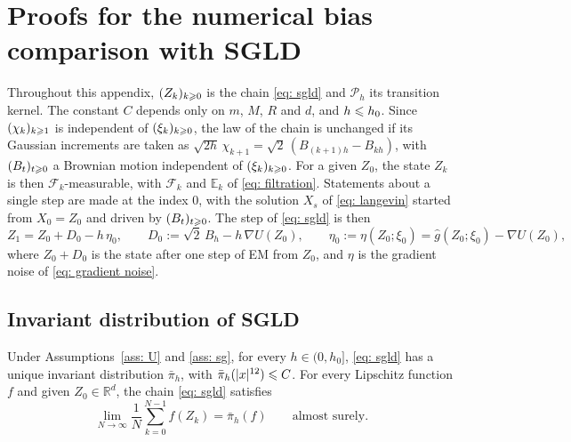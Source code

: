 \section{Proofs for the numerical bias comparison with SGLD}
\label{app: sgld}

Throughout this appendix, $(Z_k)_{k \geqslant 0}$ is the chain \eqref{eq: sgld} and $\mathcal P_h$ its transition kernel. The constant $C$ depends only on $m$, $M$, $R$ and $d$, and $h \leqslant h_0$. Since $(\chi_k)_{k \geqslant 1}$ is independent of $(\xi_k)_{k \geqslant 0}$, the law of the chain is unchanged if its Gaussian increments are taken as $\sqrt{2h}\, \chi_{k+1} = \sqrt2\, (B_{(k+1)h} - B_{kh})$, with $(B_t)_{t \geqslant 0}$ a Brownian motion independent of $(\xi_k)_{k \geqslant 0}$. For a given $Z_0$, the state $Z_k$ is then $\mathcal F_k$-measurable, with $\mathcal F_k$ and $\mathbb E_k$ of \eqref{eq: filtration}. Statements about a single step are made at the index $0$, with the solution $X_s$ of \eqref{eq: langevin} started from $X_0 = Z_0$ and driven by $(B_t)_{t \geqslant 0}$. The step of \eqref{eq: sgld} is then
\begin{equation}
    Z_1 = Z_0 + D_0 - h\, \eta_0 , \qquad D_0 := \sqrt2\, B_h - h\, \nabla U(Z_0) , \qquad \eta_0 := \eta(Z_0;\xi_0) = \hat g(Z_0;\xi_0) - \nabla U(Z_0) ,
    \label{eq: sgld step}
\end{equation}
where $Z_0 + D_0$ is the state after one step of EM from $Z_0$, and $\eta$ is the gradient noise of \eqref{eq: gradient noise}.

\subsection{Invariant distribution of SGLD}
\label{sec: sgld invariant proof}

\begin{lemma}
\label{lem: sgld invariant}
    Under Assumptions~\ref{ass: U} and \ref{ass: sg}, for every $h \in (0,h_0]$, \eqref{eq: sgld} has a unique invariant distribution $\bar\pi_h$, with $\bar\pi_h(|x|^{12}) \leqslant C$. For every Lipschitz function $f$ and given $Z_0 \in \mathbb R^d$, the chain \eqref{eq: sgld} satisfies
    \begin{equation*}
        \lim_{N \to \infty} \frac1N \sum_{k=0}^{N-1} f(Z_k) = \bar\pi_h(f) \qquad \text{almost surely} .
    \end{equation*}
\end{lemma}

